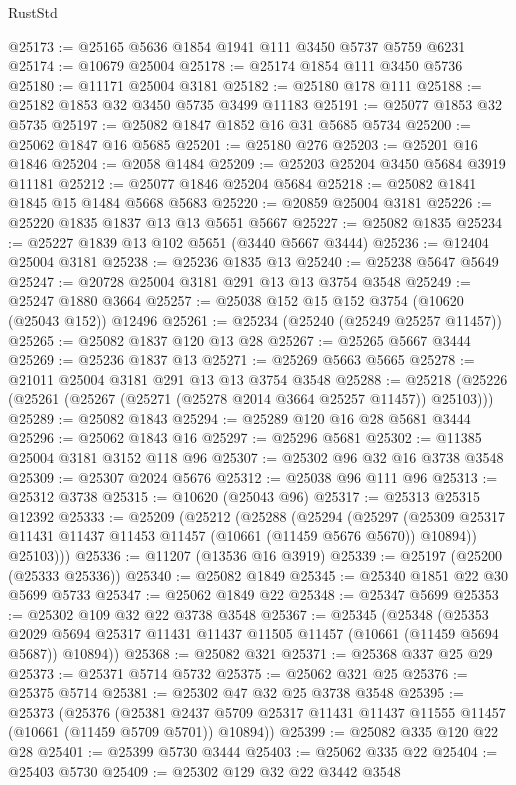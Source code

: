 \begin{lexlean}{RustStd}
\begin{coremodule}
@25173 := @25165 @5636 @1854 @1941 @111 @3450 @5737 @5759 @6231
@25174 := @10679 @25004
@25178 := @25174 @1854 @111 @3450 @5736
@25180 := @11171 @25004 @3181
@25182 := @25180 @178 @111
@25188 := @25182 @1853 @32 @3450 @5735 @3499 @11183
@25191 := @25077 @1853 @32 @5735
@25197 := @25082 @1847 @1852 @16 @31 @5685 @5734
@25200 := @25062 @1847 @16 @5685
@25201 := @25180 @276
@25203 := @25201 @16 @1846
@25204 := @2058 @1484
@25209 := @25203 @25204 @3450 @5684 @3919 @11181
@25212 := @25077 @1846 @25204 @5684
@25218 := @25082 @1841 @1845 @15 @1484 @5668 @5683
@25220 := @20859 @25004 @3181
@25226 := @25220 @1835 @1837 @13 @13 @5651 @5667
@25227 := @25082 @1835
@25234 := @25227 @1839 @13 @102 @5651 (@3440 @5667 @3444)
@25236 := @12404 @25004 @3181
@25238 := @25236 @1835 @13
@25240 := @25238 @5647 @5649
@25247 := @20728 @25004 @3181 @291 @13 @13 @3754 @3548
@25249 := @25247 @1880 @3664
@25257 := @25038 @152 @15 @152 @3754 (@10620 (@25043 @152)) @12496
@25261 := @25234 (@25240 (@25249 @25257 @11457))
@25265 := @25082 @1837 @120 @13 @28
@25267 := @25265 @5667 @3444
@25269 := @25236 @1837 @13
@25271 := @25269 @5663 @5665
@25278 := @21011 @25004 @3181 @291 @13 @13 @3754 @3548
@25288 := @25218 (@25226 (@25261 (@25267 (@25271 (@25278 @2014 @3664 @25257 @11457)) @25103)))
@25289 := @25082 @1843
@25294 := @25289 @120 @16 @28 @5681 @3444
@25296 := @25062 @1843 @16
@25297 := @25296 @5681
@25302 := @11385 @25004 @3181 @3152 @118 @96
@25307 := @25302 @96 @32 @16 @3738 @3548
@25309 := @25307 @2024 @5676
@25312 := @25038 @96 @111 @96
@25313 := @25312 @3738
@25315 := @10620 (@25043 @96)
@25317 := @25313 @25315 @12392
@25333 := @25209
    (@25212
      (@25288
        (@25294
          (@25297 (@25309 @25317 @11431 @11437 @11453 @11457 (@10661 (@11459 @5676 @5670)) @10894))
          @25103)))
@25336 := @11207 (@13536 @16 @3919)
@25339 := @25197 (@25200 (@25333 @25336))
@25340 := @25082 @1849
@25345 := @25340 @1851 @22 @30 @5699 @5733
@25347 := @25062 @1849 @22
@25348 := @25347 @5699
@25353 := @25302 @109 @32 @22 @3738 @3548
@25367 := @25345
    (@25348
      (@25353 @2029 @5694 @25317 @11431 @11437 @11505 @11457 (@10661 (@11459 @5694 @5687)) @10894))
@25368 := @25082 @321
@25371 := @25368 @337 @25 @29
@25373 := @25371 @5714 @5732
@25375 := @25062 @321 @25
@25376 := @25375 @5714
@25381 := @25302 @47 @32 @25 @3738 @3548
@25395 := @25373
    (@25376
      (@25381 @2437 @5709 @25317 @11431 @11437 @11555 @11457 (@10661 (@11459 @5709 @5701)) @10894))
@25399 := @25082 @335 @120 @22 @28
@25401 := @25399 @5730 @3444
@25403 := @25062 @335 @22
@25404 := @25403 @5730
@25409 := @25302 @129 @32 @22 @3442 @3548

\end{coremodule}
\end{lexlean}
